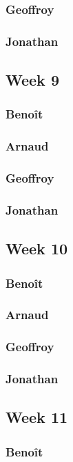 \subsubsection*{Geoffroy}
\subsubsection*{Jonathan}

\subsection*{Week 9}
\subsubsection*{Benoît}
\subsubsection*{Arnaud}
\subsubsection*{Geoffroy}
\subsubsection*{Jonathan} 

\subsection*{Week 10}
\subsubsection*{Benoît}
\subsubsection*{Arnaud}
\subsubsection*{Geoffroy}
\subsubsection*{Jonathan} 

\subsection*{Week 11}
\subsubsection*{Benoît}
